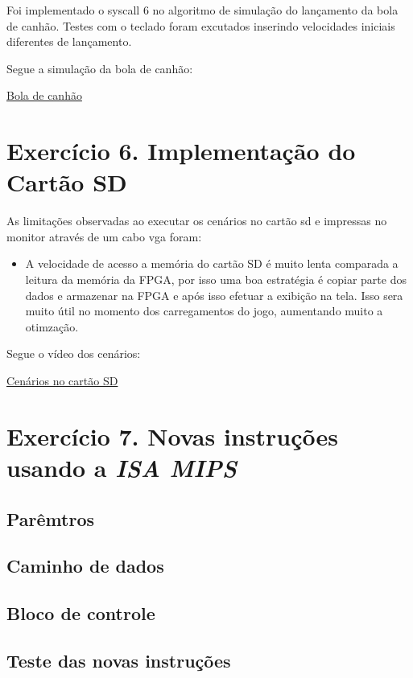 \documentclass[12pt]{article}
\begin{document}
Foi implementado o syscall 6 no algoritmo de simulação do lançamento da bola de canhão. Testes com o teclado foram excutados inserindo velocidades iniciais diferentes de lançamento.

Segue a simulação da bola de canhão:

\href{https://youtu.be/4IZcH5GzhVk}{Bola de canhão}


\section{Exercício 6. Implementação do Cartão SD}
\label{sec:cartaosd}

As limitações observadas ao executar os cenários no cartão sd e impressas no monitor através de um cabo vga foram:

\begin{itemize}
\item A velocidade de acesso a memória do cartão SD é muito lenta comparada a leitura da memória da FPGA, por isso uma boa estratégia é copiar parte dos dados e armazenar na FPGA e após isso efetuar a exibição na tela. Isso sera muito útil no momento dos carregamentos do jogo, aumentando muito a otimzação. 
\end{itemize} 

Segue o vídeo dos cenários:

\href{https://youtu.be/VeoxltP3L6o}{Cenários no cartão SD}

  
\section{Exercício 7. Novas instruções usando a \textit{ISA MIPS}}
\label{sec:isamips} 

\subsection{Parêmtros}
\label{subsec:param}


\subsection{Caminho de dados}
\label{subsec:datapath}


\subsection{Bloco de controle}
\label{subsec:control}


\subsection{Teste das novas instruções}
\label{subsec:testeisa}




\end{document}
